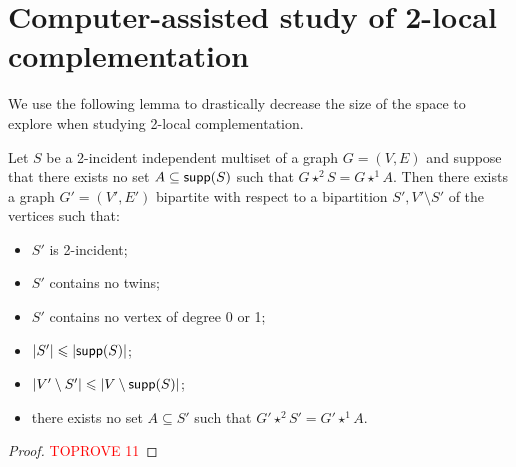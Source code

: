 \documentclass[a4paper,UKenglish,cleveref,autoref,thm-restate]{arxiv}
\newcommand{\se}{\subseteq}
\newcommand{\ls}{\leqslant}
\newcommand{\sm}{\setminus}
\newcommand{\supp}{\textup{\textsf{supp}}}
\begin{document}
\section{Computer-assisted study of 2-local complementation}
\label{app:computer}

We use the following lemma to drastically decrease the size of the space to explore when studying 2-local complementation.

\begin{lemma} \label{lemma:lifting}
    Let $S$ be a 2-incident independent multiset of a graph $G=(V,E)$ and suppose that there exists no set $A \se \supp(S)$ such that $G \star^2 S = G \star^1 A$. Then there exists a graph $G'=(V',E')$ bipartite with respect to a bipartition $S', V' \sm S'$ of the vertices such that:
    \begin{itemize}
        \item $S'$ is 2-incident;
        \item $S'$ contains no twins;
        \item $S'$ contains no vertex of degree 0 or 1;
        \item $|S'| \ls |\supp(S)|$;
        \item $|V' \sm S'|\ls |V \sm \supp(S)|$;
        \item there exists no set $A \se S'$ such that $G' \star^2 S' = G' \star^1 A$.
    \end{itemize}
\end{lemma}

\begin{proof}\textcolor{red}{TOPROVE 11}\end{proof}
\end{document}
